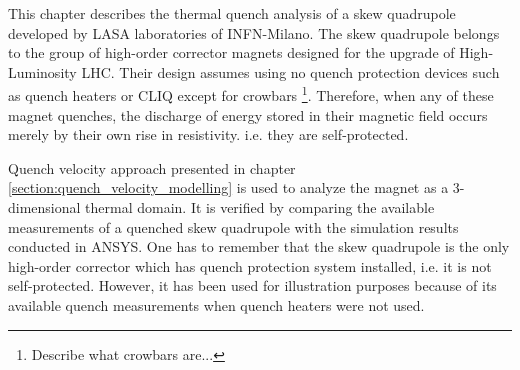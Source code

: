 
This chapter describes the thermal quench analysis of a skew quadrupole developed by LASA laboratories of INFN-Milano. The skew quadrupole belongs to the group of high-order corrector magnets designed for the upgrade of High-Luminosity LHC. Their design assumes using no quench protection devices such as quench heaters or CLIQ except for crowbars \footnote{Describe what crowbars are...}. Therefore, when any of these magnet quenches, the discharge of energy stored in their magnetic field occurs merely by their own rise in resistivity. i.e. they are self-protected.

Quench velocity approach presented in chapter \ref{section:quench_velocity_modelling} is used to analyze the magnet as a 3-dimensional thermal domain. It is verified by comparing the available measurements of a quenched skew quadrupole with the simulation results conducted in ANSYS. One has to remember that the skew quadrupole is the only high-order corrector which has quench protection system installed, i.e. it is not self-protected. However, it has been used for illustration purposes because of its available quench measurements when quench heaters were not used. 